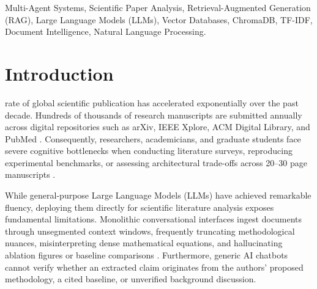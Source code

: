 \documentclass[conference]{IEEEtran}
\begin{document}
\begin{IEEEkeywords}
Multi-Agent Systems, Scientific Paper Analysis, Retrieval-Augmented Generation (RAG), Large Language Models (LLMs), Vector Databases, ChromaDB, TF-IDF, Document Intelligence, Natural Language Processing.
\end{IEEEkeywords}

\section{Introduction}

 rate of global scientific publication has accelerated exponentially over the past decade. Hundreds of thousands of research manuscripts are submitted annually across digital repositories such as arXiv, IEEE Xplore, ACM Digital Library, and PubMed \cite{bornmann2021growth}. Consequently, researchers, academicians, and graduate students face severe cognitive bottlenecks when conducting literature surveys, reproducing experimental benchmarks, or assessing architectural trade-offs across 20--30 page manuscripts \cite{cohan2020specter}. 

While general-purpose Large Language Models (LLMs) have achieved remarkable fluency, deploying them directly for scientific literature analysis exposes fundamental limitations. Monolithic conversational interfaces ingest documents through unsegmented context windows, frequently truncating methodological nuances, misinterpreting dense mathematical equations, and hallucinating ablation figures or baseline comparisons \cite{ji2023survey}. Furthermore, generic AI chatbots cannot verify whether an extracted claim originates from the authors' proposed methodology, a cited baseline, or unverified background discussion.
\end{document}
